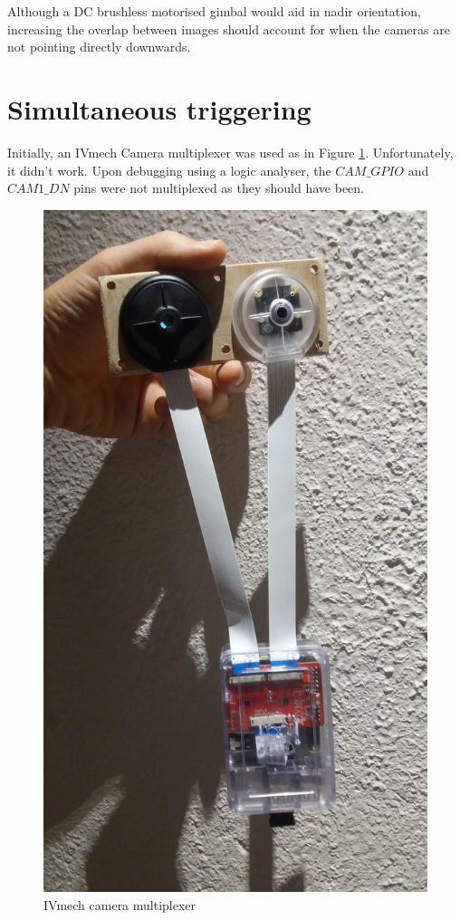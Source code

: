 Although a DC brushless motorised gimbal would aid in nadir orientation, increasing the overlap between images should account for when the cameras are not pointing directly downwards.

\section{Simultaneous triggering}

Initially, an IVmech Camera multiplexer was used as in Figure \ref{fig:ivmech}. Unfortunately, it didn't work. Upon debugging using a logic analyser, the $CAM\_GPIO$ and $CAM1\_DN$ pins were not multiplexed as they should have been.

\begin{figure}[H]
\centering
\includegraphics[scale=0.25]{images/ivmech.jpg}
\caption{IVmech camera multiplexer}
\label{fig:ivmech}
\end{figure}

